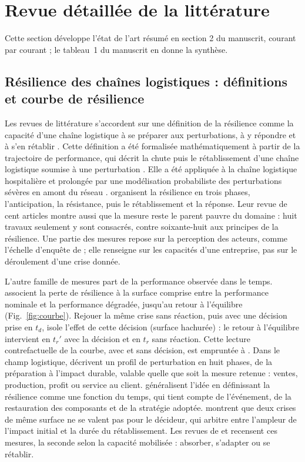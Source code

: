 \section{Revue détaillée de la littérature}
\label{sec:S2}

Cette section développe l'état de l'art résumé en section 2 du manuscrit, courant par courant ; le tableau~1 du manuscrit en donne la synthèse.

\subsection{Résilience des chaînes logistiques : définitions et courbe de résilience}
\label{sec:ea-mesure}

Les revues de littérature s'accordent sur une définition de la résilience comme la capacité d'une chaîne logistique à se préparer aux perturbations, à y répondre et à s'en rétablir \citep{tukamuhabwa2015, kamalahmadi2016}. Cette définition a été formalisée mathématiquement à partir de la trajectoire de performance, qui décrit la chute puis le rétablissement d'une chaîne logistique soumise à une perturbation \citep{rahiel2026in4pl, rahiel2026these}. Elle a été appliquée à la chaîne logistique hospitalière \citep{rahiel2025esd} et prolongée par une modélisation probabiliste des perturbations sévères en amont du réseau \citep{rahiel2026codit}. \citet{kamalahmadi2016} organisent la résilience en trois phases, l'anticipation, la résistance, puis le rétablissement et la réponse. Leur revue de cent articles montre aussi que la mesure reste le parent pauvre du domaine : huit travaux seulement y sont consacrés, contre soixante-huit aux principes de la résilience. Une partie des mesures repose sur la perception des acteurs, comme l'échelle d'enquête de \citet{chowdhury2017} ; elle renseigne sur les capacités d'une entreprise, pas sur le déroulement d'une crise donnée.

L'autre famille de mesures part de la performance observée dans le temps. \citet{bruneau2003} associent la perte de résilience à la surface comprise entre la performance nominale et la performance dégradée, jusqu'au retour à l'équilibre (Fig.~\ref{fig:courbe}). Rejouer la même crise sans réaction, puis avec une décision prise en $t_d$, isole l'effet de cette décision (surface hachurée) : le retour à l'équilibre intervient en $t_r'$ avec la décision et en $t_r$ sans réaction. Cette lecture contrefactuelle de la courbe, avec et sans décision, est empruntée à \citet{rahiel2026in4pl}. Dans le champ logistique, \citet{sheffirice2005} décrivent un profil de perturbation en huit phases, de la préparation à l'impact durable, valable quelle que soit la mesure retenue : ventes, production, profit ou service au client. \citet{henry2012} généralisent l'idée en définissant la résilience comme une fonction du temps, qui tient compte de l'événement, de la restauration des composants et de la stratégie adoptée. \citet{zobel2011} montrent que deux crises de même surface ne se valent pas pour le décideur, qui arbitre entre l'ampleur de l'impact initial et la durée du rétablissement. Les revues de \citet{hosseini2016} et \citet{hosseini2019tre} recensent ces mesures, la seconde selon la capacité mobilisée : absorber, s'adapter ou se rétablir.

